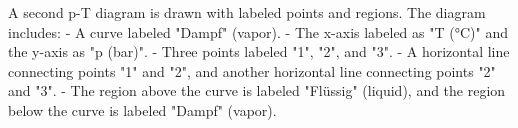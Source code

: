 A second p-T diagram is drawn with labeled points and regions. The diagram includes:  
- A curve labeled "Dampf" (vapor).  
- The x-axis labeled as "T (°C)" and the y-axis as "p (bar)".  
- Three points labeled "1", "2", and "3".  
- A horizontal line connecting points "1" and "2", and another horizontal line connecting points "2" and "3".  
- The region above the curve is labeled "Flüssig" (liquid), and the region below the curve is labeled "Dampf" (vapor).